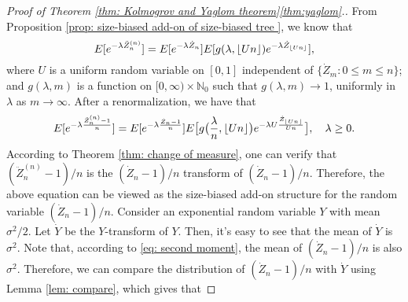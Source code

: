 \documentclass[12pt,a4paper]{amsart}
\DeclarePairedDelimiter\floor{\lfloor}{\rfloor}
\numberwithin{equation}{section}
\begin{document}

\begin{proof}[Proof of Theorem \ref{thm: Kolmogrov and Yaglom theorem}\eqref{thm:yaglom}.]
	From Proposition \ref{prop: size-biased add-on of size-biased tree }, we know that
	\[
	E [ e^{- \lambda \ddot Z_n^{(n)}} ]
	= E [e^{-\lambda \dot Z_n}] E[g(\lambda, \floor{Un})e^{-\lambda \dot Z_{\floor{Un}}}],
	\]
	where $U$ is a uniform  random variable on $[0,1]$ independent of $\{\dot Z_m: 0\le m\le n\}$;
	and $g(\lambda, m)$ is a function on $[0,\infty) \times \mathbb N_0$ such that
	$g(\lambda, m) \to 1$, uniformly in $\lambda$ as $m\to \infty$.
	After a renormalization, we have that
\begin{equation}\label{eq: renormalized size-biased add-on equation}
	E [ e^{- \lambda \frac{\ddot Z_n^{(n)}-1}{n}} ]
	= E [e^{-\lambda \frac{\dot Z_n - 1}{n}}] E\big[g\big(\frac{\lambda}{n}, \floor{Un} \big)e^{-\lambda U \frac{\dot Z_{\floor{Un}}}{Un} }\big],
	\quad \lambda \geq 0.
\end{equation}
	According to Theorem \ref{thm: change of measure}, one can verify that $(\ddot Z_n^{(n)} - 1)/n$ is the $(\dot Z_n - 1)/n$ transform of $(\dot Z_n - 1)/n$.
	Therefore, the above equation can be viewed as the size-biased add-on structure for the random variable $(\dot Z_n - 1)/n$.
	Consider an exponential random variable $Y$ with mean $\sigma^2/2$. 
	Let $\dot Y$ be the $Y$-transform of $Y$.
	Then, it's easy to see that the mean of $\dot Y$ is $\sigma^2$.
	Note that, according to \eqref{eq: second moment}, the mean of $(\dot Z_n - 1)/n$ is also $\sigma^2$. 
	Therefore, we can compare the distribution of $(\dot Z_n - 1)/n$ with $\dot Y$ using Lemma \ref{lem: compare}, which gives that
\begin{comment}
	From Theorem \ref{thm: change of measure} we know that $\ddot Z_n^{(n)}$ is the $(\dot Z_n - 1)$-transform of $\dot Z_n$.
	Therefore we can derive that
\[\begin{split}
	&\partial_\lambda (-\ln E[e^{-\lambda (\dot Z_n-1)}])
	= \frac{E[(\dot Z_n-1) e^{-\lambda (\dot Z_n-1)}]}{E[e^{-\lambda (\dot Z_n-1)}]}
	\\&\quad = E[\dot Z_n - 1] \frac{E[ e^{-\lambda (\ddot Z^{(n)}_n-1)}]}{E[e^{-\lambda (\dot Z_n-1)}]}

\end{comment}
\end{proof}
\end{document}
